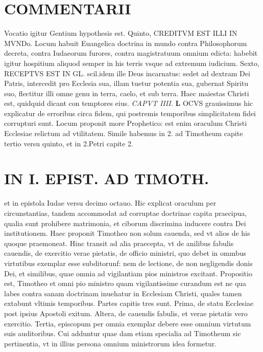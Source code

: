 \documentclass{article}
\begin{document}
\begin{pages}
\section*{COMMENTARII }
\marginpar{[ p.82 ]}\pstart Vocatio igitur Gentium hypothesis est.  \pend\pstart Quinto, CREDITVM EST ILLI IN MVNDo. Locum habuit Euangelica doctrina in mundo contra Philosophorum decreta, contra Iudaeorum furores, contra magistratuum omnium edicta: habebit igitur hospitium aliquod semper in his terris vsque ad extremum iudicium.  \pend\pstart Sexto, RECEPTVS EST IN GL. scil.idem ille Deus incarnatus: sedet ad dextram Dei Patris, intercedit pro Ecclesia sua, illam tuetur potentia sua, gubernat Spiritu suo, flectitur illi omne genu in terra, caelo, et sub terra. Haec maiestas Christi est, quidquid dicant con temptores eius.  \pend
\textit{CAPVT IIII. }
\textbf{L }\pstart OCVS grauissimus hic explicatur de erroribus circa fidem, qui postremis temporibus simplicitatem fidei corrupturi sunt. Locum proponit more Prophetico: est enim oraculum Christi Ecclesiae relictum ad vtilitatem. Simile habemus in 2. ad Timotheum capite tertio versu quinto, et in 2.Petri capite 2.  \pend
\section*{IN I. EPIST. AD TIMOTH. }
\marginpar{[ p.83 ]}\pstart et in epistola Iudae versu decimo octauo. Hic explicat oraculum per circunstantias, tandem accommodat ad corruptae doctrinae capita praecipua, qualia sunt prohibere matrimonia, et ciborum discrimina inducere contra Dei institutionem.  \pend\pstart Haec proponit Timotheo non solum cauenda, sed vt alios de his quoque praemoneat. Hinc transit ad alia praecepta, vt de anilibus fabulis cauendis, de exercitio verae pietatis, de officio ministri, quo debet in ommbus virtutibus exemplar esse subditorunf: nem de lectione, de non negligendis donis Dei, et similibus, quae omnia ad vigilantiam pios ministros excitant.  \pend\pstart Propositio est, Timotheo et omni pio ministro quam vigilantissime curandum est ne qua labes contra sanam doctrinam inuehatur in Ecclesiam Christi, quales tamen extabunt vltimis temporibus.  \pend\pstart Partes capitis tres sunt. Prima, de statu Ecclesiae post ipsius Apostoli exitum. Altera, de cauendis fabulis, et verae pietatis vero exercitio. Tertia, episcopum per omnia exemplar debere esse omnium virtutum suis auditoribus. Cui adduntur quae dam etiam specialia ad Timotheum sic pertinentia, vt in illius persona omnium ministrorum idea formetur.  \pend

\end{pages}
\end{document}
